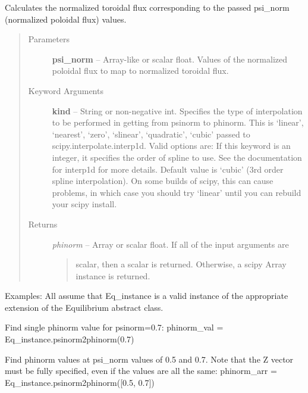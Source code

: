 \documentclass[letterpaper,10pt,english]{sphinxmanual}
\begin{document}
\begin{fulllineitems}

\begin{fulllineitems}
\label{eqtools:eqtools.eqdskreader.EqdskReader.psinorm2phinorm}
Calculates the normalized toroidal flux corresponding to the passed psi\_norm (normalized poloidal flux) values.
\begin{quote}\begin{description}
\item[{Parameters }] \leavevmode
\textbf{psi\_norm} --
Array-like or scalar float. Values of the normalized
poloidal flux to map to normalized toroidal flux.

\item[{Keyword Arguments}] \leavevmode
\textbf{kind} --
String or non-negative int. Specifies the type of interpolation
to be performed in getting from psinorm to phinorm. This is
`linear', `nearest', `zero', `slinear', `quadratic', `cubic'
passed to scipy.interpolate.interp1d. Valid options are:
If this keyword is an integer, it specifies the order of spline
to use. See the documentation for interp1d for more details.
Default value is `cubic' (3rd order spline interpolation). On
some builds of scipy, this can cause problems, in which case
you should try `linear' until you can rebuild your scipy install.

\item[{Returns}] \leavevmode

\emph{phinorm} --
Array or scalar float. If all of the input arguments are
\begin{quote}

scalar, then a scalar is returned. Otherwise, a scipy Array
instance is returned.
\end{quote}


\end{description}\end{quote}

Examples:
All assume that Eq\_instance is a valid instance of the appropriate
extension of the Equilibrium abstract class.

Find single phinorm value for psinorm=0.7:
phinorm\_val = Eq\_instance.psinorm2phinorm(0.7)

Find phinorm values at psi\_norm values of 0.5 and 0.7.
Note that the Z vector must be fully specified, even if the
values are all the same:
phinorm\_arr = Eq\_instance.psinorm2phinorm({[}0.5, 0.7{]})


\end{fulllineitems}
\end{fulllineitems}
\end{document}
